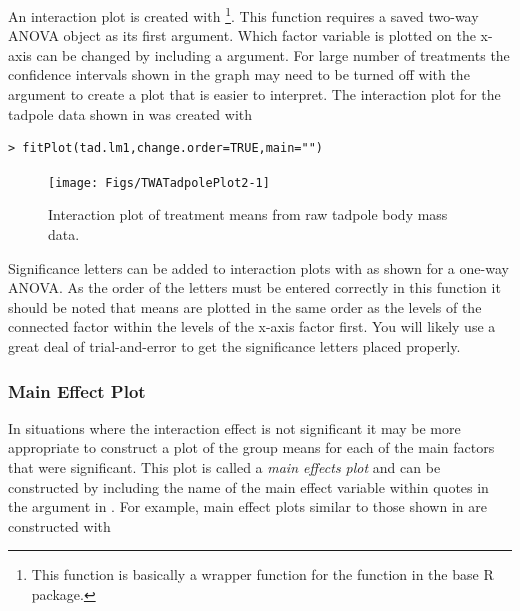 \documentclass[10pt,openany]{book}\usepackage[]{graphicx}\usepackage[]{color}
\makeatletter
\newenvironment{kframe}{%
 \def\at@end@of@kframe{}%
 \ifinner\ifhmode%
  \def\at@end@of@kframe{\end{minipage}}%
  \begin{minipage}{\columnwidth}%
 \fi\fi%
 \def\FrameCommand##1{\hskip\@totalleftmargin \hskip-\fboxsep
 \colorbox{shadecolor}{##1}\hskip-\fboxsep
     \hskip-\linewidth \hskip-\@totalleftmargin \hskip\columnwidth}%
 \MakeFramed {\advance\hsize-\width
   \@totalleftmargin\z@ \linewidth\hsize
   \@setminipage}}%
 {\par\unskip\endMakeFramed%
 \at@end@of@kframe}
\newenvironment{knitrout}{}{} %
\makeatother
\begin{document}
An interaction plot is created with \footnote{This function is basically a wrapper function for the  function in the base R  package.}.  This function requires a saved two-way ANOVA  object as its first argument.  Which factor variable is plotted on the x-axis can be changed by including a  argument.  For large number of treatments the confidence intervals shown in the graph may need to be turned off with the  argument to create a plot that is easier to interpret.  The interaction plot for the tadpole data shown in  was created with

\begin{knitrout}
\color{fgcolor}\begin{kframe}
\begin{verbatim}
> fitPlot(tad.lm1,change.order=TRUE,main="")
\end{verbatim}
\end{kframe}\begin{figure}[h]

{\centering \texttt{[image: Figs/TWATadpolePlot2-1]} 

}

\caption[Interaction plot of treatment means from raw tadpole body mass data]{Interaction plot of treatment means from raw tadpole body mass data.}\label{fig:TWATadpolePlot2}
\end{figure}


\end{knitrout}

Significance letters can be added to interaction plots with  as shown for a one-way ANOVA.  As the order of the letters must be entered correctly in this function it should be noted that means are plotted in the same order as the levels of the connected factor within the levels of the x-axis factor first.  You will likely use a great deal of trial-and-error to get the significance letters placed properly.

\subsubsection*{Main Effect Plot}
In situations where the interaction effect is not significant it may be more appropriate to construct a plot of the group means for each of the main factors that were significant.  This plot is called a \emph{main effects plot} and can be constructed by including the name of the main effect variable within quotes in the  argument in .  For example, main effect plots similar to those shown in  are constructed with
\end{document}
